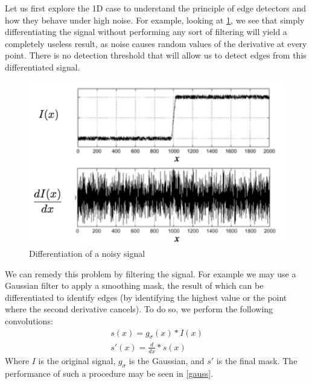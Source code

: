 \documentclass[twoside]{article}
\begin{document}
Let us first explore the 1D case to understand the principle of edge detectors and how they behave under high noise. For example, looking at \ref{noisy}, we see that simply differentiating the signal without performing any sort of filtering will yield a completely useless result, as noise causes random values of the derivative at every point. There is no detection threshold that will allow us to detect edges from this differentiated signal.

\begin{figure}[h]
  \centering
  \includegraphics[scale=.4]{noisy_uncorrected.PNG}
    \caption{Differentiation of a noisy signal}
    \label{noisy}
\end{figure}

We can remedy this problem by filtering the signal. For example we may use a Gaussian filter to apply a smoothing mask, the result of which can be differentiated to identify edges (by identifying the highest value or the point where the second derivative cancels). To do so, we perform the following convolutions:
\begin{gather*}
s(x)=g_\sigma(x) * I(x)\\
s'(x)=\frac{d}{dx} * s(x)
\end{gather*}
Where $I$ is the original signal, $g_\sigma$ is the Gaussian, and $s'$ is the final mask. The performance of such a procedure may be seen in \ref{gauss}.
\end{document}
